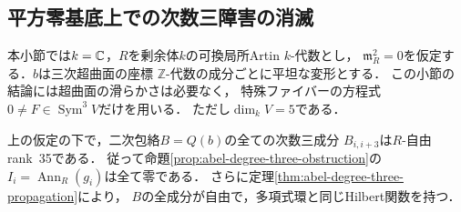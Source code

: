 \subsection{平方零基底上での次数三障害の消滅}
\label{subsec:abel-square-zero-degree-three}

本小節では$k=\mathbb C$，$R$を剰余体$k$の可換局所Artin $k$-代数とし，
$\mathfrak m_R^2=0$を仮定する．$b$は三次超曲面の座標
$\mathbb Z$-代数の成分ごとに平坦な変形とする．
この小節の結論には超曲面の滑らかさは必要なく，
特殊ファイバーの方程式$0\ne F\in\operatorname{Sym}^3V$だけを用いる．
ただし$\dim_kV=5$である．

\begin{theorem}[平方零基底における次数三の平坦性]
\label{thm:abel-square-zero-degree-three}
上の仮定の下で，二次包絡$B=Q(b)$の全ての次数三成分
$B_{i,i+3}$は$R$-自由rank~35である．
従って命題\ref{prop:abel-degree-three-obstruction}の
$I_i=\operatorname{Ann}_R(g_i)$は全て零である．
さらに定理\ref{thm:abel-degree-three-propagation}により，
$B$の全成分が自由で，多項式環と同じHilbert関数を持つ．
\end{theorem}
